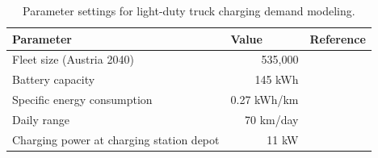         \begin{table}[]
        \centering
        \caption{Parameter settings for light-duty truck charging demand modeling.}
        \label{tab:parameters_ldv}
        \begin{tabular}{@{}lrl@{}}
        \toprule
        \textbf{Parameter}                       & \multicolumn{1}{l}{\textbf{Value}} & \textbf{Reference} \\ \midrule
        Fleet size (Austria 2040)                & 535,000                            &   \cite{umweltbundesamt_rep0808}                 \\
        Battery capacity                         & 145 kWh                            &      \cite{IRENA2019}              \\
        Specific energy consumption              & 0.27 kWh/km                       &     \cite{umweltbundesamt_rep0808}              \\
        Daily range                              & 70 km/day                          &  \cite{SCORRANO2021101022}                   \\
        Charging power at charging station depot & 11 kW                              &        \cite{SCORRANO2021101022}             \\ \bottomrule
        \end{tabular}%
        
        \end{table}


